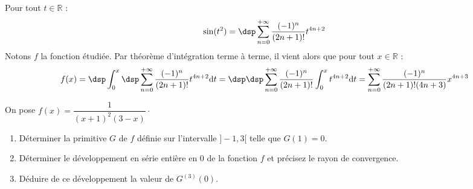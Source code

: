 \documentclass[a4paper,10pt]{report}
\begin{document}
\corr Pour tout $t\in\mathbb{R}$ : 
\[
\sin(t^2)=\dsp\sum_{n=0}^{+\infty}\dfrac{(-1)^n}{(2n+1)!}t^{4n+2}
\]
Notons $f$ la fonction étudiée. Par théorème d'intégration terme à terme, il vient alors que pour tout $x\in\mathbb{R}$ : 
$$f(x)=\dsp\int_0^x\dsp\sum_{n=0}^{+\infty}\dfrac{(-1)^n}{(2n+1)!}t^{4n+2}\mathrm{d}t=\dsp\dsp\sum_{n=0}^{+\infty}\dfrac{(-1)^n}{(2n+1)!}\int_0^xt^{4n+2}\mathrm{d}t=\sum_{n=0}^{+\infty}\dfrac{(-1)^n}{(2n+1)!(4n+3)}x^{4n+3}$$

\begin{Exercice}{} On pose $f(x)=\dfrac{1}{(x+1)^{2}(3-x)} \cdot$
\begin{enumerate}
\item Déterminer la primitive $G$ de $f$ définie sur l'intervalle $]-1,3[$ telle que $G(1)=0$.
\item Déterminer le développement en série entière en 0 de la fonction $f$ et précisez le rayon de convergence.
\item Déduire de ce développement la valeur de $G^{(3)}(0)$.
\end{enumerate}
\end{Exercice}
\end{document}
